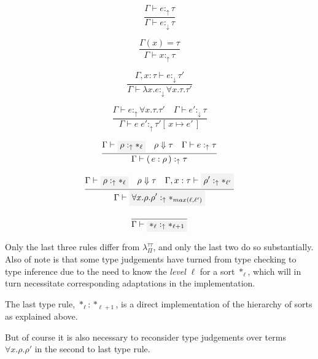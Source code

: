 \documentclass[runningheads]{llncs}
\newcommand{\mathcolorbox}[2]{\colorbox{#1}{$\displaystyle #2$}}
\begin{document}
\begin{multicols}{3}

$$
\frac{\Gamma \vdash e :_\uparrow \tau}
     {\Gamma \vdash e :_\downarrow \tau}
$$

$$
\frac{\Gamma(x) =  \tau}
        {\Gamma \vdash x :_\uparrow \tau}
$$

$$
\frac{\Gamma , x : \tau \vdash e :_\downarrow \tau'}
     {\Gamma \vdash \lambda x . e :_\downarrow \forall x . \tau . \tau'}
$$



\end{multicols}
\begin{multicols}{2}

$$
\frac{\Gamma \vdash e :_\uparrow \forall x . \tau . \tau' \quad \Gamma \vdash e' :_\downarrow \tau}
     {\Gamma \vdash e \; e' :_\uparrow \tau' \! \left [ \, x \mapsto e' \, \right ]}
$$

$$
\frac{\Gamma \vdash \mathcolorbox{hlgray}{\rho :_\uparrow \ast_\ell} \quad \rho \Downarrow \tau \quad \Gamma \vdash e :_\uparrow \tau}
     {\Gamma \vdash (\,e : \rho\,) :_\uparrow \tau}
$$

\end{multicols}
\begin{multicols}{2}

$$
\frac{\Gamma \vdash \mathcolorbox{hlgray}{\rho :_\uparrow \ast_\ell} \quad \rho \Downarrow \tau \quad \Gamma , x : \tau \vdash \mathcolorbox{hlgray}{\rho' :_\uparrow \ast_{\ell'}}}
     {\Gamma \vdash \mathcolorbox{hlgray}{\forall x . \rho . \rho' :_\uparrow \ast_{max(\ell, \ell')}}}
$$

$$
\frac{}
     {\Gamma \vdash \mathcolorbox{hlgray}{\ast_\ell :_\uparrow \ast_{\ell + 1}}}
$$

\end{multicols}

Only the last three rules differ from $\lambda_\Pi^{\tau \tau}$, and only the
last two do so substantially. Also of note is that some type judgements have
turned from type checking to type inference due to the need to know the
\textit{level} $\ell$ for a sort $\ast_\ell$, which will in turn necessitate
corresponding adaptations in the implementation.

The last type rule, $\ast_\ell : \ast_{\ell + 1}$, is a direct implementation of
the hierarchy of sorts as explained above.

But of course it is also necessary to reconsider type judgements over terms
$\forall x . \rho . \rho'$ in the second to last type rule. 
\end{document}
